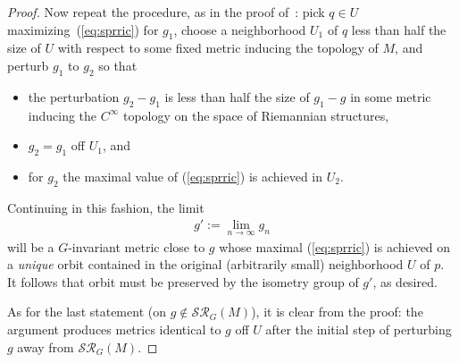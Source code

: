 \documentclass[pdftex]{sigma}%
\numberwithin{equation}{section}
\begin{document}
\begin{proof}
 Now repeat the procedure, as in the proof of~\cite[Proposition~8.3]{eb}: pick $q\in U$ maximizing~(\ref{eq:sprric}) for $g_1$, choose a neighborhood $U_1$ of $q$ less than half the size of $U$ with respect to some fixed metric inducing the topology of $M$, and perturb $g_1$ to $g_2$ so that
 \begin{itemize}\itemsep=0pt
 \item the perturbation $g_2-g_1$ is less than half the size of $g_1-g$ in some metric inducing the $C^{\infty}$ topology on the space of Riemannian structures,
 \item $g_2=g_1$ off $U_1$, and
 \item for $g_2$ the maximal value of (\ref{eq:sprric}) is achieved in $U_2$.
 \end{itemize}
 Continuing in this fashion, the limit
 \begin{gather*}
 g':=\lim_{n\to\infty}g_n
 \end{gather*}
 will be a $G$-invariant metric close to $g$ whose maximal (\ref{eq:sprric}) is achieved on a {\it unique} orbit contained in the original (arbitrarily small) neighborhood $U$ of $p$. It follows that orbit must be preserved by the isometry group of $g'$, as desired.

As for the last statement (on $g\not\in \mathcal{SR}_G(M)$), it is clear from the proof: the argument produces metrics identical to $g$ off $U$ after the initial step of perturbing $g$ away from $\mathcal{SR}_G(M)$.
\end{proof}
\end{document}
